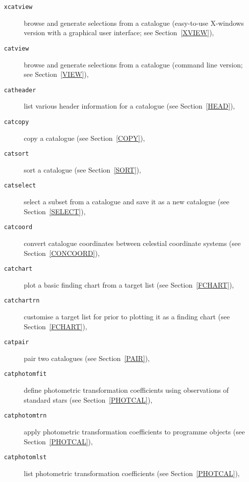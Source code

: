 \documentclass[twoside,11pt]{starlink}
\begin{document}
\begin{description}

  \item[ \texttt{xcatview} ] browse and generate selections from a
   catalogue (easy-to-use X-windows version with a graphical user
   interface; see Section~\ref{XVIEW}),

  \item[ \texttt{catview} ] browse and generate selections from a
   catalogue (command line version; see Section~\ref{VIEW}),

  \item[ \texttt{catheader} ] list various header information for a catalogue
   (see Section~\ref{HEAD}),

  \item[ \texttt{catcopy} ] copy a catalogue (see Section~\ref{COPY}),

  \item[ \texttt{catsort} ] sort a catalogue (see Section~\ref{SORT}),

  \item[ \texttt{catselect} ] select a subset from a catalogue and save it
   as a new catalogue (see Section~\ref{SELECT}),

  \item[ \texttt{catcoord} ] convert catalogue coordinates between celestial
   coordinate systems (see Section~\ref{CONCOORD}),

  \item[ \texttt{catchart} ] plot a basic finding chart from a target
   list (see Section~\ref{FCHART}),

  \item[ \texttt{catchartrn} ] customise a target list for prior to
   plotting it as a finding chart (see Section~\ref{FCHART}),

  \item[ \texttt{catpair} ] pair two catalogues (see Section~\ref{PAIR}),

  \item[ \texttt{catphotomfit} ] define photometric transformation
   coefficients using observations of standard stars
   (see Section~\ref{PHOTCAL}),

  \item[ \texttt{catphotomtrn} ] apply photometric transformation
   coefficients to programme objects (see Section~\ref{PHOTCAL}),

  \item[ \texttt{catphotomlst} ] list photometric transformation
   coefficients (see Section~\ref{PHOTCAL}),


\end{description}
\end{document}
